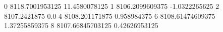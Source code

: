 0 8118.7001953125 11.4580078125
1 8106.2099609375 -1.0322265625
2 8107.2421875 0.0
4 8108.201171875 0.958984375
6 8108.61474609375 1.37255859375
8 8107.66845703125 0.42626953125
